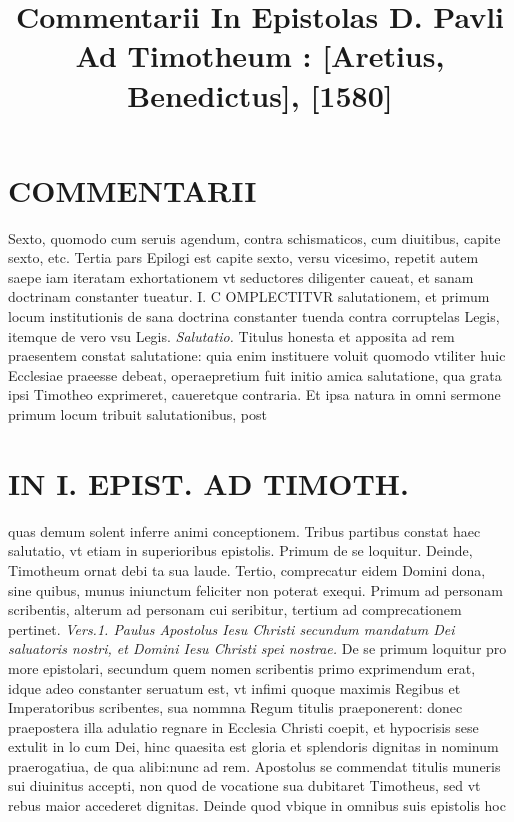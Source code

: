 \documentclass{article}
\begin{document}
\date{}
        \title{Commentarii In Epistolas D. Pavli Ad Timotheum : [Aretius, Benedictus], [1580]}
\maketitle

\begin{pages} 
\beginnumbering
        
\section*{COMMENTARII }
\marginpar{[ p.8 ]}\pstart Sexto, quomodo cum seruis agendum, contra schismaticos, cum diuitibus, capite sexto, etc.  \pend\pstart Tertia pars Epilogi est capite sexto, versu vicesimo, repetit autem saepe iam iteratam exhortationem vt seductores diligenter caueat, et sanam doctrinam constanter tueatur.  \pendCAPVT I. \pstart C OMPLECTITVR salutationem, et primum locum institutionis de sana doctrina constanter tuenda contra corruptelas Legis, itemque de vero vsu Legis.  \pend
\textit{Salutatio. }\pstart Titulus honesta et apposita ad rem praesentem constat salutatione: quia enim instituere voluit quomodo vtiliter huic Ecclesiae praeesse debeat, operaepretium fuit initio amica salutatione, qua grata ipsi Timotheo exprimeret, caueretque contraria. Et ipsa natura in omni sermone primum locum tribuit salutationibus, post  \pend
\textbf{}
\section*{IN I. EPIST. AD TIMOTH. }
\marginpar{[ p.9 ]}\pstart quas demum solent inferre animi conceptionem.  \pend\pstart Tribus partibus constat haec salutatio, vt etiam in superioribus epistolis. Primum de se loquitur. Deinde, Timotheum ornat debi ta sua laude. Tertio, comprecatur eidem Domini dona, sine quibus, munus iniunctum feliciter non poterat exequi. Primum ad personam scribentis, alterum ad personam cui seribitur, tertium ad comprecationem pertinet.  \pend
\textit{Vers.1. Paulus Apostolus Iesu Christi secundum mandatum Dei saluatoris nostri, et Domini Iesu Christi spei nostrae. }\pstart De se primum loquitur pro more epistolari, secundum quem nomen scribentis primo exprimendum erat, idque adeo constanter seruatum est, vt infimi quoque maximis Regibus et Imperatoribus scribentes, sua nommna Regum titulis praeponerent: donec praepostera illa adulatio regnare in Ecclesia Christi coepit, et hypocrisis sese extulit in lo cum Dei, hinc quaesita est gloria et splendoris dignitas in nominum praerogatiua, de qua alibi:nunc ad rem. Apostolus se commendat titulis muneris sui diuinitus accepti, non quod de vocatione sua dubitaret Timotheus, sed vt rebus maior accederet dignitas. Deinde quod vbique in omnibus suis epistolis hoc  \pend

\end{pages}
\end{document}
